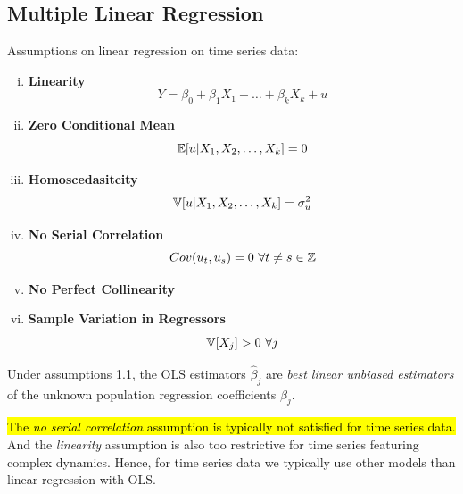 \documentclass[11pt]{article}
\begin{document}
		\subsection{Multiple Linear Regression}
		\begin{assumption} Assumptions on linear regression on time series data:
			\begin{enumerate}[(i)]
				\item \textbf{Linearity}
					\begin{equation}
						Y = \beta_0 + \beta_1 X_1 + \dots + \beta_k X_k + u
					\end{equation}
				\item \textbf{Zero Conditional Mean}
					\begin{equation}
						\mathbb{E}[{u|X_1, X_2, \dots, X_k}] = 0
					\end{equation}
				\item \textbf{Homoscedasitcity}
					\begin{equation}
						\mathbb{V}[{u|X_1, X_2, \dots, X_k}] = \sigma^2_u
					\end{equation}
				\item \textbf{No Serial Correlation}
					\begin{equation}
						Cov(u_t, u_s) = 0\ \forall t \neq s \in \mathbb{Z}
					\end{equation}
				\item \textbf{No Perfect Collinearity}
				\item \textbf{Sample Variation in Regressors}
					\begin{equation}
						\mathbb{V}[{X_j}] > 0\ \forall j
					\end{equation}
			\end{enumerate}
		\end{assumption}
		
		\begin{theorem}
			Under assumptions 1.1, the OLS estimators $\hat{\beta}_j$ are \emph{best linear unbiased estimators} of the unknown population regression coefficients $\beta_j$.
		\end{theorem}
		
		\begin{remark}
			\hl{The \emph{no serial correlation} assumption is typically not satisfied for time series data.} And the \emph{linearity} assumption is also too restrictive for time series featuring complex dynamics. Hence, for time series data we typically use other models than linear regression with OLS.
		\end{remark}
		
\end{document}
